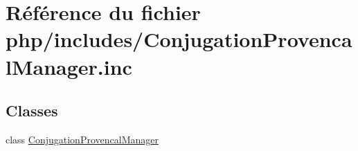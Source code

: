 \hypertarget{_conjugation_provencal_manager_8inc}{}\section{Référence du fichier php/includes/\+Conjugation\+Provencal\+Manager.inc}
\label{_conjugation_provencal_manager_8inc}
\subsection*{Classes}
\begin{DoxyCompactItemize}
\item 
class \hyperlink{class_conjugation_provencal_manager}{Conjugation\+Provencal\+Manager}
\end{DoxyCompactItemize}
